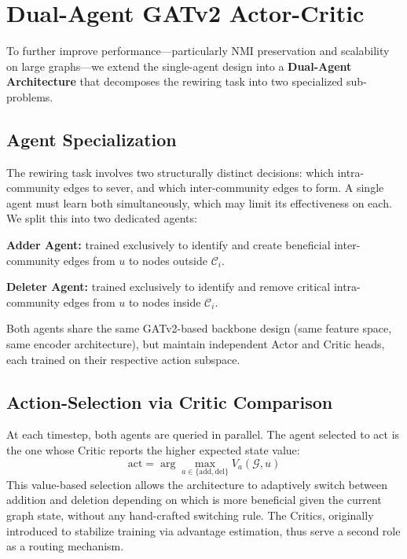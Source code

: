 \documentclass[a4paper]{article}
\begin{document}
\section{Dual-Agent GATv2 Actor-Critic}
\label{sec:dual-agent}

To further improve performance---particularly NMI preservation and
scalability on large graphs---we extend the single-agent design into a
\textbf{Dual-Agent Architecture} that decomposes the rewiring task into
two specialized sub-problems.

\subsection{Agent Specialization}

The rewiring task involves two structurally distinct decisions: which
intra-community edges to sever, and which inter-community edges to form. A
single agent must learn both simultaneously, which may limit its effectiveness
on each. We split this into two dedicated agents:

\textbf{Adder Agent:} trained exclusively to identify and create beneficial
inter-community edges from $u$ to nodes outside $\mathcal{C}_i$.

\textbf{Deleter Agent:} trained exclusively to identify and remove critical
intra-community edges from $u$ to nodes inside $\mathcal{C}_i$.

Both agents share the same GATv2-based backbone design (same feature space,
same encoder architecture), but maintain independent Actor and Critic heads,
each trained on their respective action subspace.

\subsection{Action-Selection via Critic Comparison}

At each timestep, both agents are queried in parallel. The agent selected to
act is the one whose Critic reports the higher expected state value:
\[
  \text{act} = \arg\max_{a \in \{\text{add}, \text{del}\}} V_a(\mathcal{G}, u)
\]
This value-based selection allows the architecture to adaptively switch between
addition and deletion depending on which is more beneficial given the current
graph state, without any hand-crafted switching rule. The Critics, originally
introduced to stabilize training via advantage estimation, thus serve a
second role as a routing mechanism.
\end{document}
